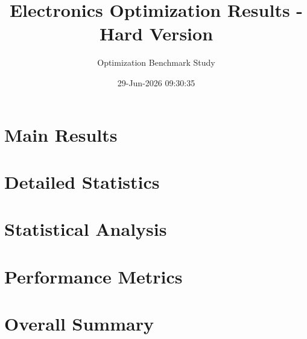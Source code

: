 \documentclass[12pt,a4paper]{article}
\begin{document}
\title{Electronics Optimization Results - Hard Version}
\author{Optimization Benchmark Study}
\date{29-Jun-2026 09:30:35}
\maketitle

\section{Main Results}



\section{Detailed Statistics}











\section{Statistical Analysis}







\section{Performance Metrics}





\section{Overall Summary}


\end{document}
